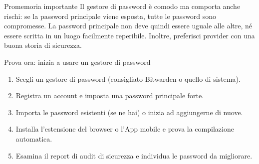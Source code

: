 \begin{tcbwarn}{Promemoria importante}
Il gestore di password è comodo ma comporta anche rischi: se la password principale viene esposta, tutte le password sono compromesse. La password principale non deve quindi essere uguale alle altre, né essere scritta in un luogo facilmente reperibile. Inoltre, preferisci provider con una buona storia di sicurezza.

\end{tcbwarn}

\begin{tcbpractice}{Prova ora: inizia a usare un gestore di password}
\begin{enumerate}
  \item Scegli un gestore di password (consigliato Bitwarden o quello di sistema).
  \item Registra un account e imposta una password principale forte.
  \item Importa le password esistenti (se ne hai) o inizia ad aggiungerne di nuove.
  \item Installa l'estensione del browser o l'App mobile e prova la compilazione automatica.
  \item Esamina il report di audit di sicurezza e individua le password da migliorare.
\end{enumerate}

\end{tcbpractice}

